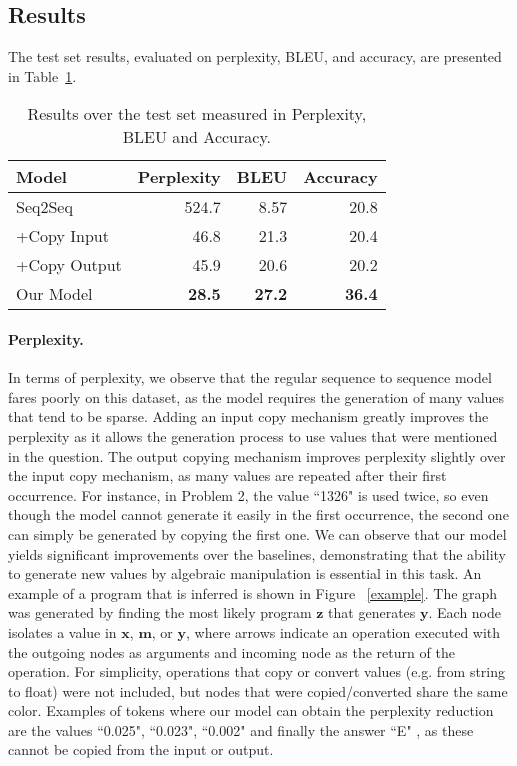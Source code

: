\subsection{Results}

The test set results, evaluated on perplexity, BLEU, and accuracy, are presented in Table~\ref{tab:results}.

\begin{table}[t]
\centering
\begin{tabular}{|l|r|r|r|}
\hline
Model & Perplexity & BLEU & Accuracy\\
\hline
Seq2Seq & 524.7 & 8.57 & 20.8\\
+Copy Input & 46.8 & 21.3 & 20.4\\
+Copy Output & 45.9 & 20.6 & 20.2\\
\hline
Our Model & \textbf{28.5} & \textbf{27.2} & \textbf{36.4}\\
\hline
\end{tabular}
\caption{Results over the test set measured in Perplexity, BLEU and Accuracy.}\label{tab:results}
\end{table}

\paragraph{Perplexity.} In terms of perplexity, we observe that the regular sequence to sequence model fares poorly on this dataset, as the model requires the generation of many values that tend to be sparse. Adding an input copy mechanism greatly improves the perplexity as it allows the generation process to use values that were mentioned in the question. The output copying mechanism improves perplexity slightly over the input copy mechanism, as many values are repeated after their first occurrence. For instance, in Problem 2, the value ``1326" is used twice, so even though the model cannot generate it easily in the first occurrence, the second one can simply be generated by copying the first one. We can observe that our model yields significant improvements over the baselines, demonstrating that the ability to generate new values by algebraic manipulation is essential in this task. An example of a program that is inferred is shown in Figure ~\ref{example}. The graph was generated by finding the most likely program $\boldsymbol{z}$ that generates $\boldsymbol{y}$. Each node isolates a value in $\boldsymbol{x}$, $\boldsymbol{m}$, or $\boldsymbol{y}$, where arrows indicate an operation executed with the outgoing nodes as arguments and incoming node as the return of the operation. For simplicity, operations that copy or convert values (e.g. from string to float) were not included, but nodes that were copied/converted share the same color. Examples of tokens where our model can obtain the perplexity reduction are the values ``0.025", ``0.023", ``0.002" and finally the answer ``E" , as these cannot be copied from the input or output. 

